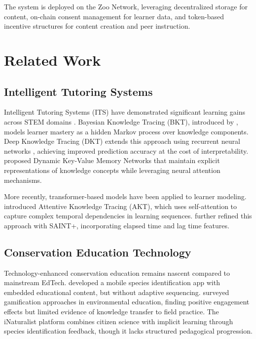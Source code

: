 \documentclass[11pt,a4paper]{article}
\begin{document}
The system is deployed on the Zoo Network, leveraging decentralized storage for content, on-chain consent management for learner data, and token-based incentive structures for content creation and peer instruction.

\section{Related Work}
\label{sec:related}

\subsection{Intelligent Tutoring Systems}

Intelligent Tutoring Systems (ITS) have demonstrated significant learning gains across STEM domains \citep{vanlehn2011relative}.
Bayesian Knowledge Tracing (BKT), introduced by \citet{corbett1994knowledge}, models learner mastery as a hidden Markov process over knowledge components.
Deep Knowledge Tracing (DKT) extends this approach using recurrent neural networks \citep{piech2015deep}, achieving improved prediction accuracy at the cost of interpretability.
\citet{zhang2017dynamic} proposed Dynamic Key-Value Memory Networks that maintain explicit representations of knowledge concepts while leveraging neural attention mechanisms.

More recently, transformer-based models have been applied to learner modeling.
\citet{ghosh2020context} introduced Attentive Knowledge Tracing (AKT), which uses self-attention to capture complex temporal dependencies in learning sequences.
\citet{shin2021saint} further refined this approach with SAINT+, incorporating elapsed time and lag time features.

\subsection{Conservation Education Technology}

Technology-enhanced conservation education remains nascent compared to mainstream EdTech.
\citet{johnson2018wildlife} developed a mobile species identification app with embedded educational content, but without adaptive sequencing.
\citet{rousell2019gamification} surveyed gamification approaches in environmental education, finding positive engagement effects but limited evidence of knowledge transfer to field practice.
The iNaturalist platform \citep{horn2018inaturalist} combines citizen science with implicit learning through species identification feedback, though it lacks structured pedagogical progression.
\end{document}
